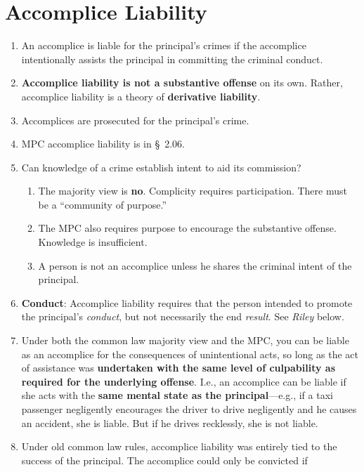 \section{Accomplice Liability}

\begin{enumerate}
    \item An accomplice is liable for the principal's crimes if the accomplice 
    intentionally assists the principal in committing the criminal conduct.
    \item \textbf{Accomplice liability is not a substantive offense} on its 
    own. Rather, accomplice liability is a theory of \textbf{derivative 
    liability}.
    \item Accomplices are prosecuted for the principal's crime.
    \item MPC accomplice liability is in \S\ 2.06.
    \item Can knowledge of a crime establish intent to aid its commission?
    \begin{enumerate}
        \item The majority view is \textbf{no}. Complicity requires 
        participation. There must be a ``community of purpose.''
        \item The MPC also requires purpose to encourage the substantive 
        offense. Knowledge is insufficient.
        \item A person is not an accomplice unless he shares the criminal 
        intent of the principal.
    \end{enumerate}
    \item \textbf{Conduct}: Accomplice liability requires that the person 
    intended to promote the principal's \emph{conduct}, but not necessarily 
    the end \emph{result}. See \emph{Riley} below.
    \item Under both the common law majority view and the MPC, you can be 
    liable as an accomplice for the consequences of unintentional acts, so long 
    as the act of assistance was \textbf{undertaken with the same level of 
    culpability as required for the underlying offense}. I.e., an accomplice 
    can be liable if she acts with the \textbf{same mental state as the 
    principal}---e.g., if a taxi passenger negligently encourages the driver 
    to drive negligently and he causes an accident, she is liable.  But if he 
    drives recklessly, she is not liable.
    \item Under old common law rules, accomplice liability was entirely tied 
    to the success of the principal. The accomplice could only be convicted if 

\end{enumerate}
